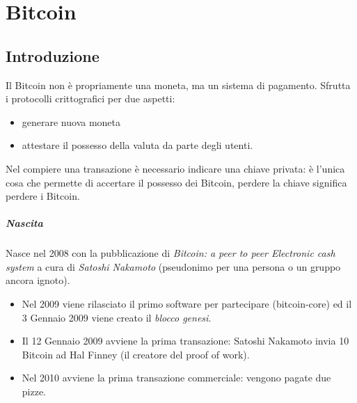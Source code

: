 \chapter{Bitcoin}
\section{Introduzione}
Il Bitcoin non è propriamente una moneta, ma un sistema di pagamento. Sfrutta i protocolli crittografici per due aspetti:
\begin{itemize}
	\item generare nuova moneta
	\item attestare il possesso della valuta da parte degli utenti.
\end{itemize} 
Nel compiere una transazione è necessario indicare una chiave privata: è l'unica cosa che permette di accertare il possesso dei Bitcoin, perdere la chiave significa perdere i Bitcoin. 
\paragraph{Nascita} Nasce nel 2008 con la pubblicazione di \emph{Bitcoin: a peer to peer Electronic cash system} a cura di \emph{Satoshi Nakamoto} (pseudonimo per una persona o un gruppo ancora ignoto).
\begin{itemize}
	\item Nel 2009 viene rilasciato il primo software per partecipare (bitcoin-core) ed il 3 Gennaio 2009 viene creato il \emph{blocco genesi}. 
	\item Il 12 Gennaio 2009 avviene la prima transazione: Satoshi Nakamoto invia 10 Bitcoin ad Hal Finney (il creatore del proof of work).
	\item Nel 2010 avviene la prima transazione commerciale: vengono pagate due pizze.
\end{itemize}

